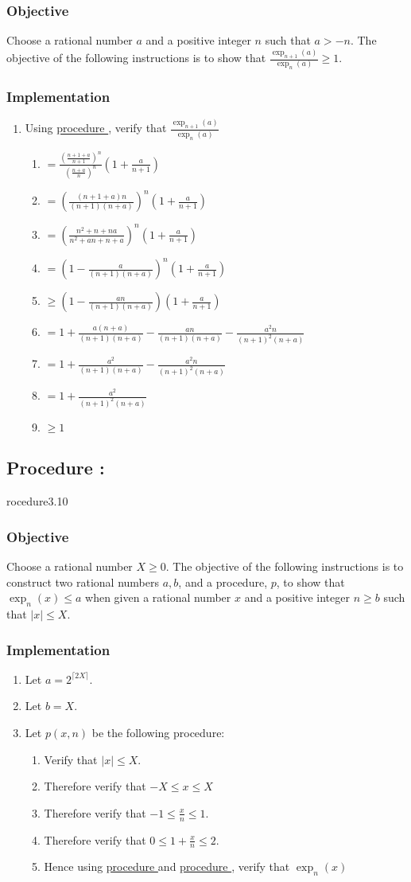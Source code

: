 \documentclass{article}
\newcounter{procedure}[part]
\newcommand{\procedure}[1]{\subsection*{Procedure \thepart:\theprocedure}\label{sec:procedure #1}\global\expandafter\edef\csname procedure#1\endcsname{\thepart:\theprocedure}\addtocounter{procedure}{1}}
\newcommand{\objective}{\subsubsection*{Objective}}
\newcommand{\implementation}{\subsubsection*{Implementation}}
\newcommand{\procedurehr}[1]{\hyperref[sec:procedure #1]{procedure \expandafter\csname procedure#1\endcsname}}
\begin{document}
\begin{multicols}{2}
			\objective
				Choose a rational number $a$ and a positive integer $n$ such that $a>-n$. The objective of the following instructions is to show that $\frac{\exp_{n+1}(a)}{\exp_n(a)}\ge 1$.
			\implementation
				\begin{enumerate}
					\item Using \procedurehr{2.07}, verify that $\frac{\exp_{n+1}(a)}{\exp_n(a)}$
					\begin{enumerate}
						\item $=\frac{(\frac{n+1+a}{n+1})^{n}}{(\frac{n+a}{n})^{n}}(1+\frac{a}{n+1})$
						\item $=(\frac{(n+1+a)n}{(n+1)(n+a)})^n(1+\frac{a}{n+1})$
						\item $=(\frac{n^2+n+na}{n^2+an+n+a})^n(1+\frac{a}{n+1})$
						\item $=(1-\frac{a}{(n+1)(n+a)})^n(1+\frac{a}{n+1})$
						\item $\ge(1-\frac{an}{(n+1)(n+a)})(1+\frac{a}{n+1})$
						\item $=1+\frac{a(n+a)}{(n+1)(n+a)}-\frac{an}{(n+1)(n+a)}-\frac{a^2n}{(n+1)^2(n+a)}$
						\item $=1+\frac{a^2}{(n+1)(n+a)}-\frac{a^2n}{(n+1)^2(n+a)}$
						\item $=1+\frac{a^2}{(n+1)^2(n+a)}$
						\item $\ge 1$
					\end{enumerate}
				\end{enumerate}
		\procedure{3.10}
			\objective
				Choose a rational number $X\ge 0$. The objective of the following instructions is to construct two rational numbers $a,b$, and a procedure, $p$, to show that $\exp_n(x)\le a$ when given a rational number $x$ and a positive integer $n\ge b$ such that $\lvert x\rvert\le X$.
			\implementation
				\begin{enumerate}
					\item Let $a=2^{\lceil 2X\rceil}$.
					\item Let $b=X$.
					\item Let $p(x,n)$ be the following procedure:
					\begin{enumerate}
						\item Verify that $\lvert x\rvert\le X$.
						\item Therefore verify that $-X\le x\le X$
						\item Therefore verify that $-1\le\frac{x}{n}\le 1$.
						\item Therefore verify that $0\le 1+\frac{x}{n}\le 2$.
						\item Hence using \procedurehr{3.08} and \procedurehr{3.09}, verify that $\exp_n(x)$

\end{enumerate}
\end{enumerate}
\end{multicols}
\end{document}
